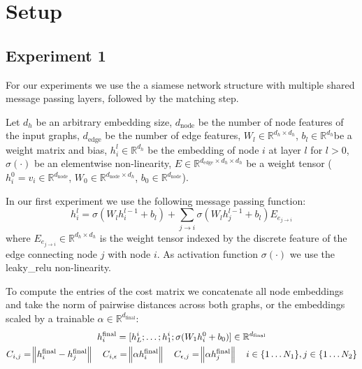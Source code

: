 \section{Setup}


\subsection{Experiment 1}

For our experiments we use the a siamese network structure with multiple shared message passing layers, followed by the matching step.


Let $d_h$ be an arbitrary embedding size, $d_{\text{node}}$ be the number of node features of the input graphs, $d_{\text{edge}}$ be the number of edge features, $W_l \in \mathbb{R}^{d_h \times d_h}$, $b_l \in   \mathbb{R}^{d_h}$be a weight matrix and bias, $h_i^l \in \mathbb{R}^{d_h}$ be the embedding of node $i$ at layer $l$ for $l > 0$, $\sigma(\cdot)$ be an elementwise non-linearity, $E \in \mathbb{R}^{d_{\text{edge}} \times d_h \times d_h}$ be a weight tensor ($h_i^0 = v_i \in \mathbb{R}^{d_{\text{node}}}$, $W_0 \in \mathbb{R}^{d_{\text{node}} \times d_h}$, $b_0 \in \mathbb{R}^{d_{\text{node}}}$).

In our first experiment we use the following message passing function:
\begin{equation}
     h_i^{l} = \sigma(W_{l} h_i^{l-1} + b_l) + \sum_{j \rightarrow i} \sigma(W_{l} h_j^{l-1} + b_l) E_{e_{j \rightarrow i}}
\end{equation}
where $E_{e_{j \rightarrow i}} \in \mathbb{R}^{d_h \times d_h}$ is the weight tensor indexed by the discrete feature of the edge connecting node $j$ with node $i$. As activation function $\sigma(\cdot)$ we use the leaky\_relu non-linearity.

To compute the entries of the cost matrix we concatenate all node embeddings and take the norm of pairwise distances across both graphs, or the embeddings scaled by a trainable $\alpha \in \mathbb{R}^{d_\text{final}}$:
\begin{equation}
     \begin{gathered}
          h_i^\text{final} = [h_L^i ; \dots ; h_1^i ; \sigma(W_{1} h_i^{0} + b_0)] \in \mathbb{R}^{d_\text{final}}\\
          C_{i,j} = \norm{h_i^\text{final} - h_j^\text{final}} \quad
          C_{i, \epsilon} = \norm{ \alpha h_i^\text{final}} \quad
          C_{\epsilon, j} = \norm{ \alpha h_j^\text{final}} \quad i \in \{1 \dots N_1\}, j \in \{1 \dots N_2\}
     \end{gathered}
\end{equation}


